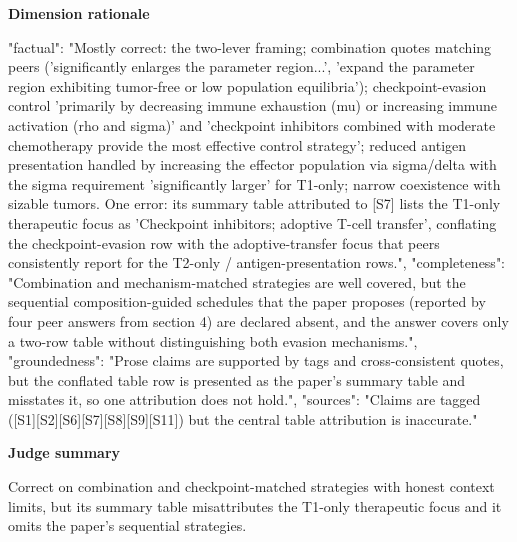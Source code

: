\documentclass[10pt]{article}
\begin{document}
\textbf{Dimension rationale}
\begin{EvidenceText}
{
  "factual": "Mostly correct: the two-lever framing; combination quotes matching peers ('significantly enlarges the parameter region...', 'expand the parameter region exhibiting tumor-free or low population equilibria'); checkpoint-evasion control 'primarily by decreasing immune exhaustion (mu) or increasing immune activation (rho and sigma)' and 'checkpoint inhibitors combined with moderate chemotherapy provide the most effective control strategy'; reduced antigen presentation handled by increasing the effector population via sigma/delta with the sigma requirement 'significantly larger' for T1-only; narrow coexistence with sizable tumors. One error: its summary table attributed to [S7] lists the T1-only therapeutic focus as 'Checkpoint inhibitors; adoptive T-cell transfer', conflating the checkpoint-evasion row with the adoptive-transfer focus that peers consistently report for the T2-only / antigen-presentation rows.",
  "completeness": "Combination and mechanism-matched strategies are well covered, but the sequential composition-guided schedules that the paper proposes (reported by four peer answers from section 4) are declared absent, and the answer covers only a two-row table without distinguishing both evasion mechanisms.",
  "groundedness": "Prose claims are supported by tags and cross-consistent quotes, but the conflated table row is presented as the paper's summary table and misstates it, so one attribution does not hold.",
  "sources": "Claims are tagged ([S1][S2][S6][S7][S8][S9][S11]) but the central table attribution is inaccurate."
}
\end{EvidenceText}

\textbf{Judge summary}
\begin{EvidenceText}
Correct on combination and checkpoint-matched strategies with honest context limits, but its summary table misattributes the T1-only therapeutic focus and it omits the paper's sequential strategies.
\end{EvidenceText}
\end{document}
